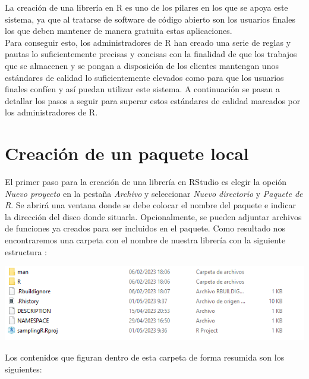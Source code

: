 La creación de una librería en R es uno de los pilares en los que se apoya este sistema, ya que al tratarse de software de código abierto son los usuarios finales los que deben mantener de manera gratuita estas aplicaciones.\\

Para conseguir esto, los administradores de R han creado una serie de reglas y pautas lo suficientemente precisas y concisas con la finalidad de que los trabajos que se almacenen y se pongan a disposición de los clientes mantengan unos estándares de calidad lo suficientemente elevados como para que los usuarios finales confíen y así puedan utilizar este sistema. A continuación se pasan a detallar los pasos a seguir para superar estos estándares de calidad marcados por los administradores de R.
\section{Creación de un paquete local}

El primer paso para la creación de una librería en RStudio es elegir la opción \textit{Nuevo proyecto} en la pestaña \textit{Archivo} y seleccionar \textit{Nuevo directorio} y \textit{Paquete de R}. Se abrirá una ventana donde se debe colocar el nombre del paquete e indicar la dirección del disco donde situarla. Opcionalmente, se pueden adjuntar archivos de funciones ya creados para ser incluidos en el paquete. Como resultado nos encontraremos una carpeta con el nombre de nuestra librería con la siguiente estructura :\\

\begin{center}
    \centering
    \includegraphics[scale=0.8]{img/proyecto.png}
    \label{fig:proj}
\end{center}

Los contenidos que figuran dentro de esta carpeta de forma resumida son los siguientes:\\

